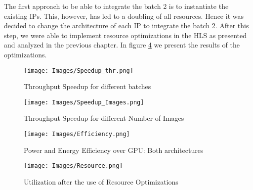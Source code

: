 The first approach to be able to integrate the batch 2 is to instantiate the existing IPs. This, however, has led to a doubling of all resources. Hence it was decided to change the architecture of each IP to integrate the batch 2. After this step, we were able to implement resource optimizations in the HLS as presented and analyzed in the previous chapter. In figure \ref{fig:31} we present the results of the optimizations.

\begin{figure}[h]
\centering
\texttt{[image: Images/Speedup\_thr.png]} 
\decoRule
\caption[Throughput Speedup for different batches]{Throughput Speedup for different batches
}
\label{fig:28}
\end{figure}

\begin{figure}[h]
\centering
\texttt{[image: Images/Speedup\_Images.png]} 
\decoRule
\caption[Throughput Speedup for different Number of Images]{Throughput Speedup for different Number of Images
}
\label{fig:29}
\end{figure}

\begin{figure}[h]
\centering
\texttt{[image: Images/Efficiency.png]} 
\decoRule
\caption[Power and Energy Efficiency over GPU]{Power and Energy Efficiency over GPU: Both architectures 
}
\label{fig:30}
\end{figure}



\begin{figure}[h]
\centering
\texttt{[image: Images/Resource.png]} 
\decoRule
\caption[Utilization after the use of Resource Optimizations]{Utilization after the use of  Resource Optimizations
}
\label{fig:31}
\end{figure}




